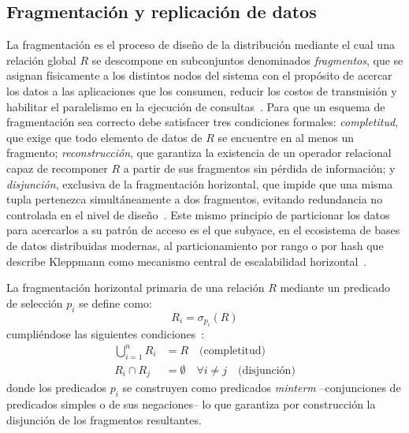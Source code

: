 \documentclass[11pt,a4paper]{article}
\begin{document}
\subsection{Fragmentaci\'on y replicaci\'on de datos}

La fragmentaci\'on es el proceso de dise\~no de la distribuci\'on mediante el
cual una relaci\'on global $R$ se descompone en subconjuntos denominados
\emph{fragmentos}, que se asignan f\'isicamente a los distintos nodos del
sistema con el prop\'osito de acercar los datos a las aplicaciones que los
consumen, reducir los costos de transmisi\'on y habilitar el paralelismo en
la ejecuci\'on de consultas~\cite{mehta2022,ge2024,ozsu2020}. Para que un esquema de
fragmentaci\'on sea correcto debe satisfacer tres condiciones formales:
\emph{completitud}, que exige que todo elemento de datos de $R$ se encuentre
en al menos un fragmento; \emph{reconstrucci\'on}, que garantiza la
existencia de un operador relacional capaz de recomponer $R$ a partir de sus
fragmentos sin p\'erdida de informaci\'on; y \emph{disjunci\'on}, exclusiva
de la fragmentaci\'on horizontal, que impide que una misma tupla pertenezca
simult\'aneamente a dos fragmentos, evitando redundancia no controlada en el
nivel de dise\~no~\cite{mehta2022,nashat2018,ozsu2020}. Este mismo principio de
particionar los datos para acercarlos a su patr\'on de acceso es el que
subyace, en el ecosistema de bases de datos distribuidas modernas, al
particionamiento por rango o por hash que describe Kleppmann como mecanismo
central de escalabilidad horizontal~\cite{kleppmann2017}.

La fragmentaci\'on horizontal primaria de una relaci\'on $R$ mediante un
predicado de selecci\'on $p_i$ se define como:
\begin{equation}
R_i = \sigma_{p_i}(R)
\end{equation}
cumpli\'endose las siguientes condiciones~\cite{ge2024,mehta2022}:
\begin{align}
\bigcup_{i=1}^{n} R_i &= R \quad \text{(completitud)} \label{eq:completitud} \\
R_i \cap R_j &= \emptyset \quad \forall i \neq j \quad \text{(disjunci\'on)} \label{eq:disjuncion}
\end{align}
donde los predicados $p_i$ se construyen como predicados \emph{minterm} --conjunciones de predicados simples o de sus negaciones-- lo que garantiza por construcci\'on la disjunci\'on de los fragmentos resultantes.
\end{document}
